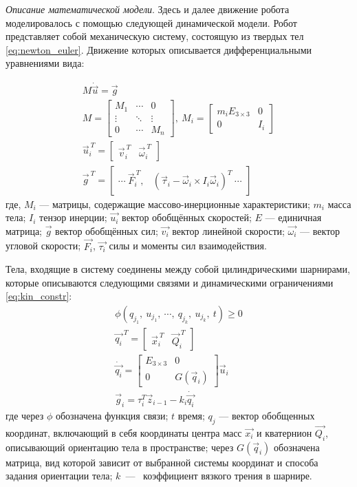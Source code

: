 \textit{Описание математической модели}. Здесь и далее движение робота моделировалось с помощью следующей динамической модели. Робот представляет собой механическую систему, состоящую из твердых тел \eqref{eq:newton_euler}. Движение которых описывается дифференциальными уравнениями вида:

\begin{align}
    \label{eq:newton_euler}
    M \dot{\vec{u}} = \vec{g} \\
    M = \begin{bmatrix}
    M_1 & \cdots  & 0 \\
    \vdots  & \ddots  & \vdots  \\ 
    0 & \cdots   & M_n 
    \end{bmatrix},\ M_i = \begin{bmatrix}
    m_i E_{3\times 3} & 0 \\ 
    0 & I_i 
    \end{bmatrix} \\
    \vec{u}_i^{\ T} = \begin{bmatrix}
        \vec{v}_i^{\ T} & \vec{\omega}_i^{\ T}
    \end{bmatrix} \\ 
    \vec{g}^{\ T} = \begin{bmatrix}
        \cdots \  \vec{F}_i^{\ T}, & (\vec{\tau}_i - \vec{\omega}_i \times I_i \vec{\omega}_i)^T\  \cdots 
    \end{bmatrix}
\end{align}
где, $M_i$ --- матрицы, содержащие массово-инерционные характеристики; $m_i$ масса тела; $I_i$ тензор инерции; $\vec{u_i}$ вектор обобщённых скоростей; $E$ --- единичная матрица; $\vec{g}$ вектор обобщённых сил; $\vec{v_i}$ вектор линейной скорости; $\vec{\omega_i}$ --- вектор угловой скорости; $\vec{F_i}$, $\vec{\tau_i}$ силы и моменты сил взаимодействия.

Тела, входящие в систему соединены между собой цилиндрическими шарнирами, которые описываются следующими связями и динамическими ограничениями \eqref{eq:kin_constr}:
\begin{align}
    \label{eq:kin_constr}
    \phi(q_{j_1},\ u_{j_1},\ \cdots,\ q_{j_k},\ u_{j_k},\ t) \geqslant  0 \\
    \vec{q_i}^{\ T} = \begin{bmatrix}
        \vec{x}_i^{\ T} & \vec{Q}_i^{\ T}
    \end{bmatrix} \\
    \dot{\vec{q_i}} = \begin{bmatrix}
    E_{3\times3} & 0\\ 
    0 & G(\vec{q}_i) 
    \end{bmatrix}\vec{u}_i  \\
    \vec{g}_i = \tau_i^T \vec{z}_{i-1} -k_i \dot{\vec{q_i}}
\end{align}
где через $\phi$ обозначена функция связи; $t$ время; $q_{j}$ --- вектор обобщенных координат, включающий в себя координаты центра масс $\vec{x_i}$ и кватернион $\vec{Q_i}$, описывающий ориентацию тела в пространстве; через $G(\vec{q}_i)$ обозначена матрица, вид которой зависит от выбранной системы координат и способа задания ориентации тела; $k$~---~ коэффициент вязкого трения в шарнире.

